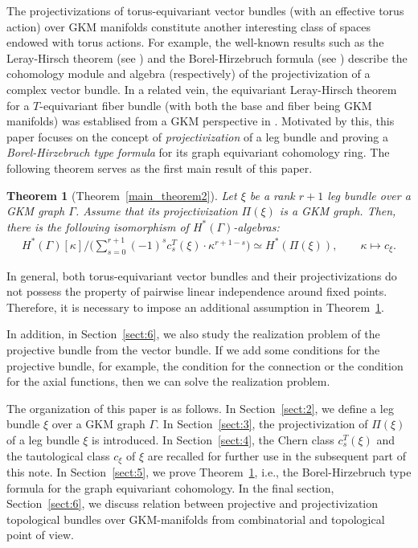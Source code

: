 \documentclass[12pt]{amsart}
\newcounter{thmMaincounter}
\newtheorem{theoremM}[thmMaincounter]{Theorem}
\theoremstyle{definition}
\theoremstyle{remark}
\numberwithin{equation}{section}
\begin{document}
The projectivizations of
torus-equivariant vector bundles (with an effective torus action) over GKM manifolds constitute another interesting class of spaces endowed with torus actions.
For example, the well-known results such as the Leray-Hirsch theorem (see \cite[Theorem 4D.1, p.~432]{H}) and the Borel-Hirzebruch formula (see \cite[Chapter V, Section 15]{BH}) describe the cohomology module and algebra (respectively) of the projectivization of a complex vector bundle.
In a related vein, the equivariant Leray-Hirsch theorem for a $T$-equivariant fiber bundle (with both the base and fiber being GKM manifolds) was
establised from a GKM perspective in \cite{GSZ'}.
Motivated by this, %
this paper focuses on the concept of {\it projectivization} of a leg bundle and proving a {\it Borel-Hirzebruch type formula} for its graph equivariant cohomology ring.
The following theorem serves as the first main result of this paper.
\begin{theoremM}[Theorem~\ref{main_theorem2}]
\label{main_theorem_intro}
Let $\xi$ be a rank $r+1$ leg bundle over a GKM graph $\Gamma$.
Assume that its projectivization $\Pi(\xi)$ is a GKM graph.
Then, there is the following isomorphism of  $H^*(\Gamma)$-algebras:
\begin{align*}
H^{*}(\Gamma)[\kappa]\big/\biggl( \sum_{s=0}^{r+1} (-1)^{s}c_{s}^{T}(\xi) \cdot \kappa^{r+1-s} \biggr)\simeq H^{*}(\Pi(\xi)),\quad \quad \kappa\mapsto c_{\xi}.
\end{align*}
\end{theoremM}
In general, both torus-equivariant vector bundles and their projectivizations do not possess the property of pairwise linear independence around fixed points.
Therefore, it is necessary to impose an additional assumption in Theorem~\ref{main_theorem_intro}.

In addition, in Section~\ref{sect:6}, we also study the realization problem of the projective bundle from the vector bundle.
If we add some conditions for the projective bundle, for example, the condition for the connection or the condition for the axial functions, then we can solve the realization problem.
 
The organization of this paper is as follows.
In Section~\ref{sect:2}, we define a leg bundle $\xi$ over a GKM graph $\Gamma$.
In Section~\ref{sect:3}, the projectivization of $\Pi(\xi)$ of a leg bundle $\xi$ is introduced.
In Section~\ref{sect:4}, 
the Chern class $c_{s}^{T}(\xi)$ and the tautological class $c_{\xi}$ of $\xi$ are recalled for further use in the subsequent part of this note.
In Section~\ref{sect:5}, we prove Theorem~\ref{main_theorem_intro}, i.e., the Borel-Hirzebruch type formula for the graph equivariant cohomology.
In the final section, Section~\ref{sect:6}, we discuss relation between projective and projectivization topological bundles over GKM-manifolds from combinatorial and topological point of view.
\end{document}
